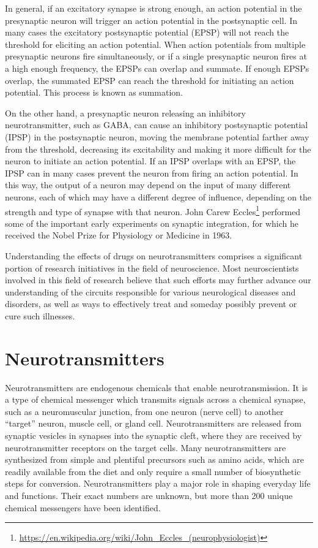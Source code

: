 \documentclass[]{book}
\let\rmarkdownfootnote\footnote%
\def\footnote{\protect\rmarkdownfootnote}
\renewcommand{\href}[2]{#2\footnote{\url{#1}}}
\begin{document}
In general, if an excitatory synapse is strong enough, an action potential in the presynaptic neuron will trigger an action potential in the postsynaptic cell. In many cases the excitatory postsynaptic potential (EPSP) will not reach the threshold for eliciting an action potential. When action potentials from multiple presynaptic neurons fire simultaneously, or if a single presynaptic neuron fires at a high enough frequency, the EPSPs can overlap and summate. If enough EPSPs overlap, the summated EPSP can reach the threshold for initiating an action potential. This process is known as summation.

On the other hand, a presynaptic neuron releasing an inhibitory neurotransmitter, such as GABA, can cause an inhibitory postsynaptic potential (IPSP) in the postsynaptic neuron, moving the membrane potential farther away from the threshold, decreasing its excitability and making it more difficult for the neuron to initiate an action potential. If an IPSP overlaps with an EPSP, the IPSP can in many cases prevent the neuron from firing an action potential. In this way, the output of a neuron may depend on the input of many different neurons, each of which may have a different degree of influence, depending on the strength and type of synapse with that neuron. \href{https://en.wikipedia.org/wiki/John_Eccles_(neurophysiologist)}{John Carew Eccles} performed some of the important early experiments on synaptic integration, for which he received the Nobel Prize for Physiology or Medicine in 1963.

Understanding the effects of drugs on neurotransmitters comprises a significant portion of research initiatives in the field of neuroscience. Most neuroscientists involved in this field of research believe that such efforts may further advance our understanding of the circuits responsible for various neurological diseases and disorders, as well as ways to effectively treat and someday possibly prevent or cure such illnesses.

\hypertarget{neurotransmitters}{%
\section{Neurotransmitters}\label{neurotransmitters}}

Neurotransmitters are endogenous chemicals that enable neurotransmission. It is a type of chemical messenger which transmits signals across a chemical synapse, such as a neuromuscular junction, from one neuron (nerve cell) to another ``target'' neuron, muscle cell, or gland cell. Neurotransmitters are released from synaptic vesicles in synapses into the synaptic cleft, where they are received by neurotransmitter receptors on the target cells. Many neurotransmitters are synthesized from simple and plentiful precursors such as amino acids, which are readily available from the diet and only require a small number of biosynthetic steps for conversion. Neurotransmitters play a major role in shaping everyday life and functions. Their exact numbers are unknown, but more than 200 unique chemical messengers have been identified.
\end{document}
